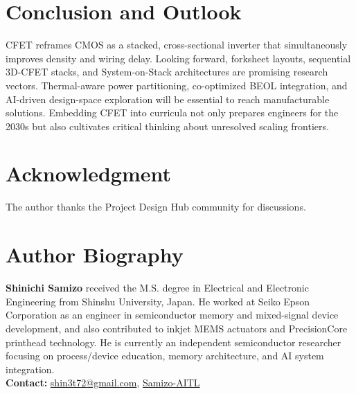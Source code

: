 \documentclass[conference]{IEEEtran}
\begin{document}
\section{Conclusion and Outlook}
CFET reframes CMOS as a stacked, cross-sectional inverter that simultaneously improves density and wiring delay.
Looking forward, forksheet layouts, sequential 3D-CFET stacks, and System-on-Stack architectures are promising research vectors.
Thermal-aware power partitioning, co-optimized BEOL integration, and AI-driven design-space exploration will be essential to reach manufacturable solutions.
Embedding CFET into curricula not only prepares engineers for the 2030s but also cultivates critical thinking about unresolved scaling frontiers.

\section*{Acknowledgment}
The author thanks the Project Design Hub community for discussions.




\section*{Author Biography}
\noindent\textbf{Shinichi Samizo}
received the M.S. degree in Electrical and Electronic Engineering from Shinshu University, Japan.
He worked at Seiko Epson Corporation as an engineer in semiconductor memory and mixed-signal device development, and also contributed to inkjet MEMS actuators and PrecisionCore printhead technology.
He is currently an independent semiconductor researcher focusing on process/device education, memory architecture, and AI system integration.\\[2pt]
\textbf{Contact:} \href{mailto:shin3t72@gmail.com}{shin3t72@gmail.com}, \href{https://github.com/Samizo-AITL}{Samizo-AITL}
\end{document}
